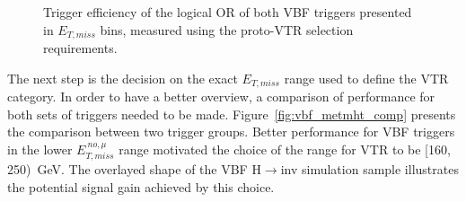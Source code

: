 \begin{figure}[htbp]
  \centering
  \caption{Trigger efficiency of the logical OR of both VBF triggers presented in $E_{T,miss}$ bins, measured using the proto-VTR selection requirements.}
  \label{fig:vbf_proto_trig_eff}
\end{figure}

\hspace{10pt} The next step is the decision on the exact $E_{T,miss}$ range used to define the VTR category. In order to have a better overview, a comparison of performance for both sets of triggers needed to be made. Figure~\ref{fig:vbf_metmht_comp} presents the comparison between two trigger groups. Better performance for VBF triggers in the lower $E_{T,miss}^{~no, \mu}$ range motivated the choice of the range for VTR to be [160, 250)~GeV. The overlayed shape of the VBF H$\rightarrow$inv simulation sample illustrates the potential signal gain achieved by this choice.

